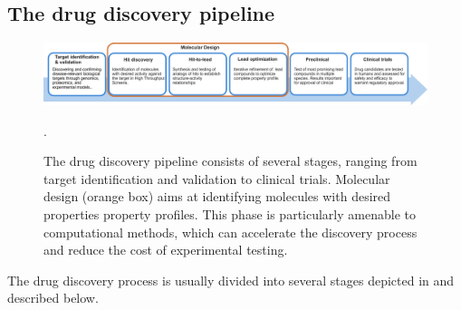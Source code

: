 \subsection{The drug discovery pipeline}
\begin{figure}
      \centering
      \includegraphics[width=\textwidth]{figures/drug-discovery-pipeline_v2.pdf}
      \caption{The drug discovery pipeline consists of several stages, ranging from target identification
            and validation to clinical trials. Molecular design (orange box) aims at identifying
            molecules with desired properties property profiles. This phase is particularly amenable to
            computational methods, which can accelerate the discovery process and reduce the cost of
            experimental testing.\label{fig:drug-discovery-pipeline}}.
\end{figure}

The drug discovery process is usually divided into several stages \citep{todo} depicted in
 and described below.

